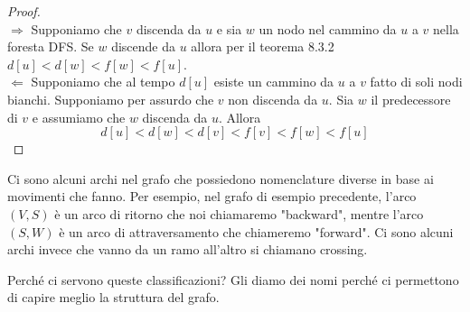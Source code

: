 \documentclass[a4paper]{article}
\begin{document}
\begin{proof}
  \\
  $\Longrightarrow$ Supponiamo che $v$ discenda da $u$ e sia $w$ un nodo nel cammino da $u$ a $v$ nella foresta DFS.
  Se $w$ discende da $u$ allora per il teorema 8.3.2 $d[u] < d[w] < f[w] < f[u]$.\\
  $\Longleftarrow$ Supponiamo che al tempo $d[u]$ esiste un cammino da $u$ a $v$ fatto di soli nodi bianchi.
  Supponiamo per assurdo che $v$ non discenda da $u$. 
  Sia $w$ il predecessore di $v$ e assumiamo che $w$ discenda da $u$. Allora \[d[u] < d[w] < d[v] < f[v] < f[w] < f[u]\]
\end{proof}
Ci sono alcuni archi nel grafo che possiedono nomenclature diverse in base ai movimenti che fanno. Per esempio, nel grafo di esempio precedente, l'arco $(V, S)$ è un arco di ritorno che noi chiamaremo "backward", mentre l'arco $(S, W)$ è un arco di attraversamento che chiameremo "forward".
Ci sono alcuni archi invece che vanno da un ramo all'altro si chiamano crossing. 
\begin{figure}[H]
  \centering
\end{figure}
\noindent
Perché ci servono queste classificazioni?
Gli diamo dei nomi perché ci permettono di capire meglio la struttura del grafo.
\end{document}
